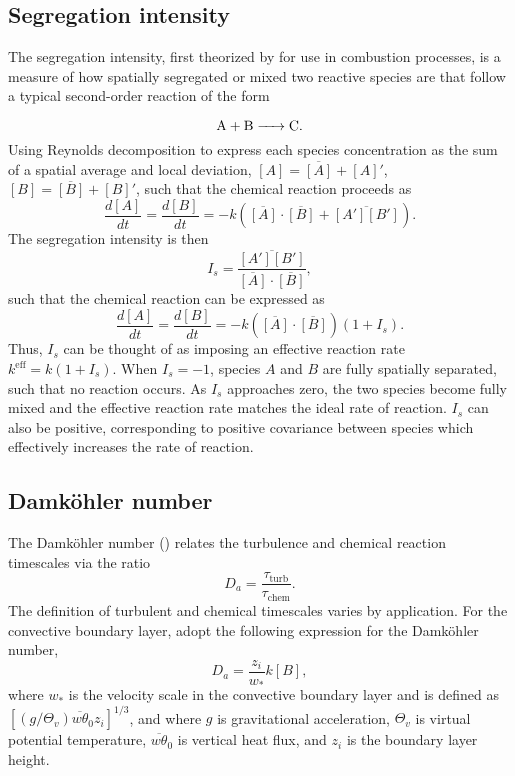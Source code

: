 \subsection{Segregation intensity}
The segregation intensity, first theorized by \cite{danckwerts_definition_1952} for use in combustion processes, is a measure of how spatially segregated or mixed two reactive species are that follow a typical second-order reaction of the form

\begin{equation}
\ce{A + B -> C}.
\end{equation}
Using Reynolds decomposition to express each species concentration as the sum of a spatial average and local deviation, $[A] = \overline{[A]} + [A]'$, $[B] = \overline{[B]} + [B]'$, such that the  chemical reaction proceeds as 
\begin{equation}
\frac{d[A]}{dt} = \frac{d[B]}{dt} = -k\left(\overline{[A]}\cdot\overline{[B]} + \overline{[A'][B']} \right).
\end{equation}
The segregation intensity is then 
\begin{equation}
I_s = \frac{\overline{[A'][B']}}{\overline{[A]}\cdot\overline{[B]}},
\end{equation}
such that the chemical reaction can be expressed as 
\begin{equation}
\frac{d[A]}{dt} = \frac{d[B]}{dt} = -k\left(\overline{[A]}\cdot\overline{[B]}\right)\left(1 + I_s \right).
\end{equation}
Thus, $I_s$ can be thought of as imposing an effective reaction rate $k^{\text{eff}} = k(1+I_s)$. When $I_s = -1$, species $A$ and $B$ are fully spatially separated, such that no reaction occurs. As $I_s$ approaches zero, the two species become fully mixed and the effective reaction rate matches the ideal rate of reaction. $I_s$ can also be positive, corresponding to positive covariance between species which effectively increases the rate of reaction.

\subsection{Damköhler number}
The Damköhler number (\cite{damkohler_effect_1947}) relates the turbulence and chemical reaction timescales via the ratio
\begin{equation}
D_a = \frac{\tau_{\text{turb}}}{\tau_{\text{chem}}}.
\end{equation}
The definition of turbulent and chemical timescales varies by application. For the convective boundary layer, \cite{vinuesa_fluxes_2003} adopt the following expression for the Damköhler number,
\begin{equation}
D_a = \frac{z_i}{w_*}k[B],
\end{equation}
where $w_*$ is the velocity scale in the convective boundary layer and is defined as $\left[(g/\Theta_v)\overline{w\theta}_0 z_i\right]^{1/3}$, and where $g$ is gravitational acceleration, $\Theta_v$ is virtual potential temperature, $\overline{w\theta}_0$ is vertical heat flux, and $z_i$ is the boundary layer height.


